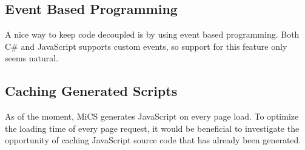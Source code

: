 \subsection{Event Based Programming} %
\label{sub:fw_event_based_programming}
	A nice way to keep code decoupled is by using event based programming. Both C\# and JavaScript supports custom events, so support for this feature only seems natural.

\subsection{Caching Generated Scripts} %
\label{sub:fw_script_caching}
	As of the moment, MiCS generates JavaScript on every page load. To optimize the loading time of every page request, it would be beneficial to investigate the opportunity of caching JavaScript source code that has already been generated.
